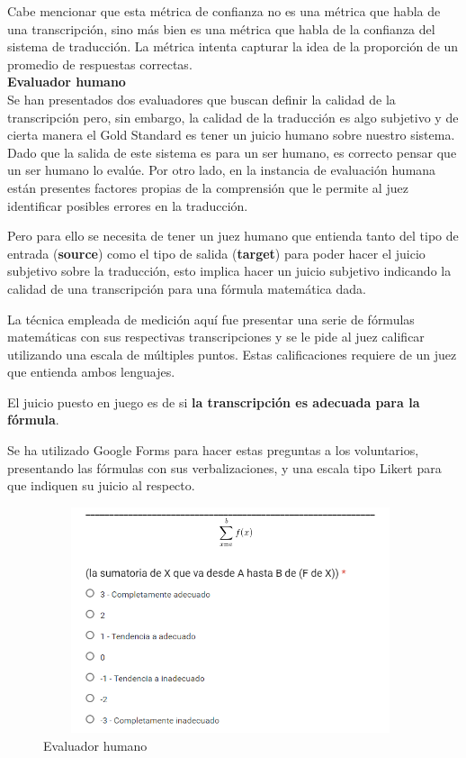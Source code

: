 Cabe mencionar que esta métrica de confianza no es una métrica que habla de una transcripción, sino más bien es una métrica que habla de la confianza del sistema de traducción. La métrica intenta capturar la idea de la proporción de un promedio de respuestas correctas.\\

{\Large \textbf{Evaluador humano}}\\

Se han presentados dos evaluadores que buscan definir la calidad de la transcripción pero, sin embargo, la calidad de la traducción es algo subjetivo y de cierta manera el Gold Standard es tener un juicio humano sobre nuestro sistema. Dado que la salida de este sistema es para un ser humano, es correcto pensar que un ser humano lo evalúe. Por otro lado, en la instancia de evaluación humana están presentes factores propias de la comprensión que le permite al juez identificar posibles errores en la traducción.

Pero para ello se necesita de tener un juez humano que entienda tanto del tipo de entrada (\textbf{source}) como el tipo de salida (\textbf{target}) para poder hacer el juicio subjetivo sobre la traducción, esto implica hacer un juicio subjetivo indicando la calidad de una transcripción para una fórmula matemática dada.

La técnica empleada de medición aquí fue presentar una serie de fórmulas matemáticas con sus respectivas transcripciones y se le pide al juez calificar utilizando una escala de múltiples puntos. Estas calificaciones requiere de un juez que entienda ambos lenguajes.

El juicio puesto en juego es de si \textbf{la transcripción es adecuada para la fórmula}.

Se ha utilizado Google Forms para hacer estas preguntas a los voluntarios, presentando las fórmulas con sus verbalizaciones, y una escala tipo Likert\cite{12} para que indiquen su juicio al respecto.

\begin{figure}[H]
\centering
  \includegraphics[width=11cm, height=6.62cm]{Figures/evaluadorhumano}
  \caption[]{Evaluador humano}
\label{fig:evaluadorhumano}
\end{figure}

